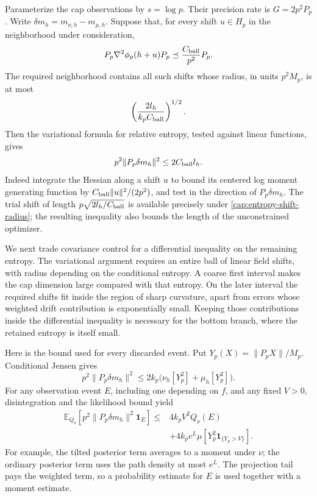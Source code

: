 Parameterize the cap observations by $s=\log p$. Their precision rate is
$G=2p^2P_p$. Write $\delta m_h=m_{\nu,h}-m_{\mu,h}$. Suppose that, for
every shift $u\in H_p$ in the neighborhood under consideration,
\[
 P_p\nabla^2\phi_p(h+u)P_p\preceq \frac{C_{\rm ball}}{p^2}P_p.
\]
The required neighborhood contains all such shifts whose radius, in
units $p^2M_p$, is at most
\begin{equation}\label{cap:entropy-shift-radius}
 \left(\frac{2l_h}{k_p C_{\rm ball}}\right)^{1/2}.
\end{equation}
Then the variational formula for relative entropy, tested against linear
functions, gives
\begin{equation}\label{cap:entropy-mean-bound}
 p^2\|P_p\delta m_h\|^2\le2C_{\rm ball}l_h.
\end{equation}
Indeed integrate the Hessian along a shift $u$ to bound its centered log
moment generating function by $C_{\rm ball}\|u\|^2/(2p^2)$, and test in the
direction of $P_p\delta m_h$. The trial shift of length $p\sqrt{2l_h/C_{\rm ball}}$
is available precisely under \eqref{cap:entropy-shift-radius}; the resulting
inequality also bounds the length of the unconstrained optimizer.

We next trade covariance control for a differential inequality on the
remaining entropy. The variational argument requires an entire ball of linear
field shifts, with radius depending on the conditional entropy. A coarse first
interval makes the cap dimension large compared with that entropy. On the
later interval the required shifts fit inside the region of sharp curvature,
apart from errors whose weighted drift contribution is exponentially small.
Keeping those contributions inside the differential inequality is necessary
for the bottom branch, where the retained entropy is itself small.

Here is the bound used for every discarded event. Put
$Y_p(X)=\|P_pX\|/M_p$. Conditional Jensen gives
\[
 p^2\|P_p\delta m_h\|^2
 \le2k_p\bigl(\nu_h[Y_p^2]+\mu_h[Y_p^2]\bigr).
\]
For any observation event $E$, including one depending on $f$, and any
fixed $V>0$, disintegration and the likelihood bound yield
\begin{equation}\label{cap:discarded-drift}
\begin{split}
 \mathbb E_{Q_\nu}\!\left[
 p^2\|P_p\delta m_h\|^2\mathbf1_E\right]
 \le{}&4k_pV^2Q_\nu(E)\\
 &+4k_pe^L\mu\!\left[Y_p^2\mathbf1_{\{Y_p>V\}}\right].
\end{split}
\end{equation}
For example, the tilted posterior term averages to a moment under $\nu$;
the ordinary posterior term uses the path density at most $e^L$.
The projection tail pays the weighted term, so a probability estimate for
$E$ is used together with a moment estimate.

